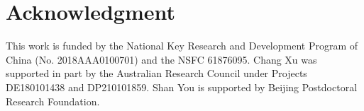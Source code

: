 \documentclass{article}
\newcommand{\<}{\left\langle}
\renewcommand{\>}{\right\rangle}
\begin{document}
\section*{Acknowledgment}
This work is funded by the National Key Research and Development Program of China (No. 2018AAA0100701) and the NSFC 61876095. Chang Xu was supported in part by the Australian Research Council under Projects DE180101438 and DP210101859. Shan You is supported by Beijing Postdoctoral Research Foundation.

{\small


}
\end{document}
